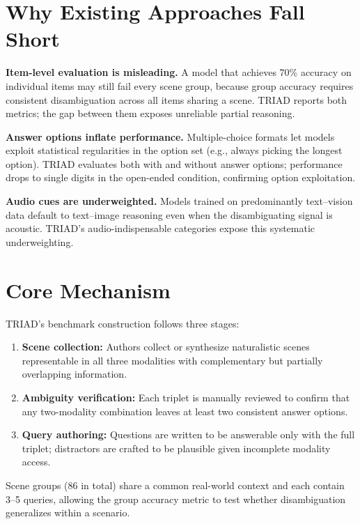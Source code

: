 \documentclass[10pt,twocolumn]{article}
\begin{document}
\section{Why Existing Approaches Fall Short}

\textbf{Item-level evaluation is misleading.}
A model that achieves 70\% accuracy on individual items may still fail
every scene group, because group accuracy requires consistent
disambiguation across all items sharing a scene. TRIAD reports both
metrics; the gap between them exposes unreliable partial reasoning.

\textbf{Answer options inflate performance.}
Multiple-choice formats let models exploit statistical regularities in
the option set (e.g., always picking the longest option). TRIAD
evaluates both with and without answer options; performance drops to
single digits in the open-ended condition, confirming option exploitation.

\textbf{Audio cues are underweighted.}
Models trained on predominantly text--vision data default to text--image
reasoning even when the disambiguating signal is acoustic. TRIAD's
audio-indispensable categories expose this systematic underweighting.

\section{Core Mechanism}

TRIAD's benchmark construction follows three stages:

\begin{enumerate}[itemsep=2pt,parsep=0pt]
  \item \textbf{Scene collection:} Authors collect or synthesize
    naturalistic scenes representable in all three modalities with
    complementary but partially overlapping information.
  \item \textbf{Ambiguity verification:} Each triplet is manually
    reviewed to confirm that any two-modality combination leaves
    at least two consistent answer options.
  \item \textbf{Query authoring:} Questions are written to be
    answerable only with the full triplet; distractors are crafted
    to be plausible given incomplete modality access.
\end{enumerate}

Scene groups (86 in total) share a common real-world context and
each contain 3--5 queries, allowing the group accuracy metric to
test whether disambiguation generalizes within a scenario.
\end{document}
